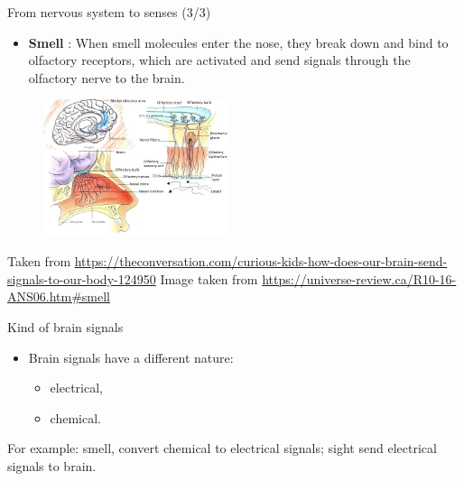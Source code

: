 \documentclass{beamer}
\begin{document}
\begin{frame}
{\centerline{From nervous system to senses (3/3)}}
\begin{itemize}
    \item \textbf{Smell} : When smell molecules enter the nose, they break down and bind to olfactory receptors, which are activated and send signals through the olfactory nerve to the brain.
\end{itemize}
\begin{figure}
    \centering
    \includegraphics[height=4cm]{P2023.AIBCCSS.BrainSignals/smell.jpg}
\end{figure}
\begin{center}
    \tiny{Taken from \url{https://theconversation.com/curious-kids-how-does-our-brain-send-signals-to-our-body-124950}}
    \tiny{Image taken from \url{https://universe-review.ca/R10-16-ANS06.htm\#smell}}
\end{center}    

\end{frame}


\begin{frame}
{\centerline{Kind of brain signals}}
\begin{itemize}
    \item Brain signals have a different nature:
    \begin{itemize}
        \item electrical,
        \item chemical.
    \end{itemize}
\end{itemize}

For example: smell, convert chemical to electrical signals; sight send electrical signals to brain.

\end{frame}
\end{document}
